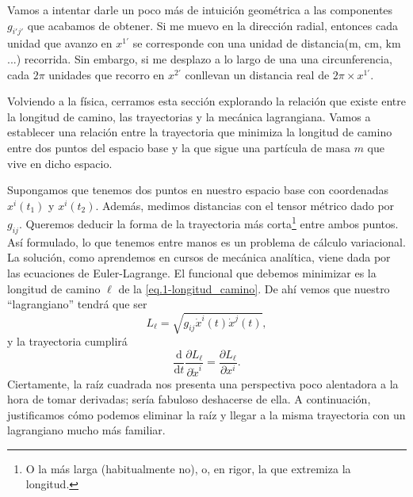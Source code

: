 \begin{example}
    Vamos a intentar darle un poco más de intuición geométrica a las componentes \(g_{i'j'}\) que acabamos de obtener. Si me muevo en la dirección radial, entonces cada unidad que avanzo en \(x^{1'}\) se corresponde con una unidad de distancia(\(\mathrm{m}\), \(\mathrm{cm}\), \(\mathrm{km}\)...) recorrida. Sin embargo, si me desplazo a lo largo de una una circunferencia, cada \(2\pi\) unidades que recorro en \(x^{2'}\) conllevan un distancia real de \(2\pi \times x^{1'}\).
\end{example}

Volviendo a la física, cerramos esta sección explorando la relación que existe entre la longitud de camino, las trayectorias y la mecánica lagrangiana. Vamos a establecer una relación entre la trayectoria que minimiza la longitud de camino entre dos puntos del espacio base y la que sigue una partícula de masa \(m\) que vive en dicho espacio. 

Supongamos que tenemos dos puntos en nuestro espacio base con coordenadas \(x^i(t_1)\) y \(x^i(t_2)\). Además, medimos distancias con el tensor métrico dado por \(g_{ij}\). Queremos deducir la forma de la trayectoria más corta\footnote{O la más larga (habitualmente no), o, en rigor, la que extremiza la longitud.} entre ambos puntos. Así formulado, lo que tenemos entre manos es un problema de cálculo variacional. La solución, como aprendemos en cursos de mecánica analítica, viene dada por las ecuaciones de Euler-Lagrange. El funcional que debemos minimizar es la longitud de camino \(\ell\) de la \cref{eq.1-longitud_camino}. De ahí vemos que nuestro ``lagrangiano'' tendrá que ser 
\begin{equation}
    L_\ell = \sqrt{g_{ij}\dot{x}^i(t) \dot{x}^j(t)},
\end{equation}
y la trayectoria cumplirá
\begin{equation}
    \frac{\mathrm{d}}{\mathrm{d}t} \frac{\partial L_\ell}{\partial \dot{x}^i} = \frac{\partial L_\ell}{\partial x^i}.
\end{equation}
Ciertamente, la raíz cuadrada nos presenta una perspectiva poco alentadora a la hora de tomar derivadas; sería fabuloso deshacerse de ella. A continuación, justificamos cómo podemos eliminar la raíz y llegar a la misma trayectoria con un lagrangiano mucho más familiar.

